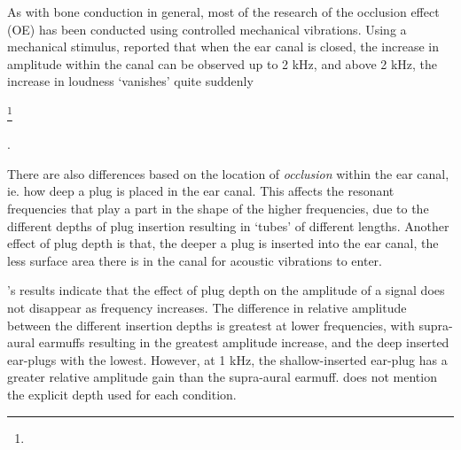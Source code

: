  
As with bone conduction in general, most of the research of the occlusion effect (OE) has been conducted using controlled mechanical vibrations.  Using a mechanical stimulus, \cite{bekesy:60} reported that when the ear canal is closed, the increase in amplitude within the canal can be observed up to 2 kHz, and above 2 kHz, the increase in loudness `vanishes' quite suddenly\DIFdelbegin {}%

\footnote{}%
\addtocounter{footnote}{-1}%
\DIFdelend . %
\DIFaddbegin 

\DIFaddend There are also differences based on the location of \textit{occlusion} within the ear canal, ie. how deep a plug is placed in the ear canal.  This affects the resonant frequencies that play a part in the shape of the higher frequencies, due to the different depths of plug insertion resulting in `tubes' of different lengths.  Another effect of plug depth is that, the deeper a plug is inserted into the ear canal, the less surface area there is in the canal for acoustic vibrations to enter.  

\cite{dean:00}'s results indicate that the effect of plug depth on the amplitude of a signal does not disappear as frequency increases. The difference in relative amplitude between the different insertion depths is greatest at lower frequencies, with supra-aural earmuffs resulting in the greatest amplitude increase, and the deep inserted ear-plugs with the lowest.  However, at 1 kHz, the shallow-inserted ear-plug has a greater relative amplitude gain than the supra-aural earmuff.  \cite{dean:00} does not mention the explicit depth used for each condition. 


